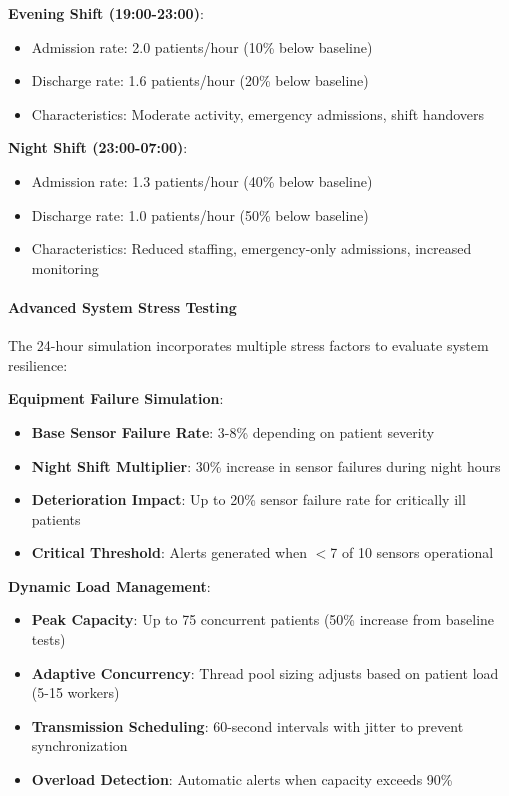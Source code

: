\textbf{Evening Shift (19:00-23:00)}:
\begin{itemize}
    \item Admission rate: 2.0 patients/hour (10\% below baseline)
    \item Discharge rate: 1.6 patients/hour (20\% below baseline)
    \item Characteristics: Moderate activity, emergency admissions, shift handovers
\end{itemize}

\textbf{Night Shift (23:00-07:00)}:
\begin{itemize}
    \item Admission rate: 1.3 patients/hour (40\% below baseline)
    \item Discharge rate: 1.0 patients/hour (50\% below baseline)
    \item Characteristics: Reduced staffing, emergency-only admissions, increased monitoring
\end{itemize}

\paragraph{Advanced System Stress Testing}
The 24-hour simulation incorporates multiple stress factors to evaluate system resilience:

\textbf{Equipment Failure Simulation}:
\begin{itemize}
    \item \textbf{Base Sensor Failure Rate}: 3-8\% depending on patient severity
    \item \textbf{Night Shift Multiplier}: 30\% increase in sensor failures during night hours
    \item \textbf{Deterioration Impact}: Up to 20\% sensor failure rate for critically ill patients
    \item \textbf{Critical Threshold}: Alerts generated when $<$7 of 10 sensors operational
\end{itemize}

\textbf{Dynamic Load Management}:
\begin{itemize}
    \item \textbf{Peak Capacity}: Up to 75 concurrent patients (50\% increase from baseline tests)
    \item \textbf{Adaptive Concurrency}: Thread pool sizing adjusts based on patient load (5-15 workers)
    \item \textbf{Transmission Scheduling}: 60-second intervals with jitter to prevent synchronization
    \item \textbf{Overload Detection}: Automatic alerts when capacity exceeds 90\%
\end{itemize}

